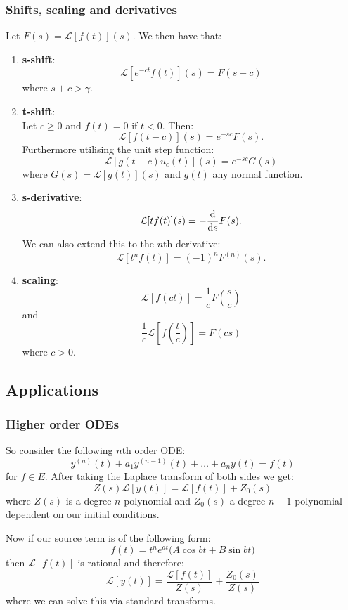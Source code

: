 \documentclass{article}
\begin{document}
\begin{multicols}{3}
\subsubsection{Shifts, scaling and derivatives}
Let $F(s)=\mathcal{L}[f(t)](s)$.
We then have that:
\begin{enumerate}
    \item \textbf{s-shift}:
    $$\mathcal{L}[e^{-ct}f(t)](s)=F(s+c)$$
    where $s+c>\gamma$.
    \item \textbf{t-shift}: \\
    Let $c\geq0$ and $f(t)=0$ if $t<0$. Then:
    $$\mathcal{L}[f(t-c)](s)=e^{-sc}F(s).$$
    Furthermore utilising the unit step function:
    $$\mathcal{L}[g(t-c)u_c(t)](s)=e^{-sc}G(s)$$
    where $G(s)=\mathcal{L}[g(t)](s)$
    and $g(t)$ any normal function.

    \item \textbf{s-derivative}:
    $$\mathcal{L}[tf(t)](s)=-\dv{s}F(s).$$
    We can also extend this to the $n$th derivative:
    $$\mathcal{L}[t^n f(t)]
    =(-1)^n F^{(n)}(s).$$

    \item \textbf{scaling}:
    $$\mathcal{L}[f(ct)]=\frac{1}{c}F(\frac{s}{c})$$
    and
    $$\frac{1}{c}\mathcal{L}[f(\frac{t}{c})]=F(cs)$$
    where $c>0$.
\end{enumerate}

\subsection{Applications}

\subsubsection{Higher order ODEs}
So consider the following $n$th order ODE:
$$y^{(n)}(t)+a_1y^{(n-1)}(t)+\dots
+a_n y(t)=f(t)$$
for $f\in E$. After taking the Laplace transform of both sides
we get:
$$Z(s)\mathcal{L}[y(t)]
=\mathcal{L}[f(t)]+Z_0(s)$$
where $Z(s)$ is a degree $n$ polynomial
and $Z_0(s)$ a degree $n-1$ polynomial dependent on our 
initial conditions.

Now if our source term is of the following form:
$$f(t)=t^n e^{at}\bigl(A\cos bt+B\sin bt\bigr)$$
then $\mathcal{L}[f(t)]$ is rational and therefore:
$$\mathcal{L}[y(t)]=\frac{\mathcal{L}[f(t)]}{Z(s)}+\frac{Z_0(s)}{Z(s)}$$
where we can solve this via standard transforms.


\end{multicols}
\end{document}

